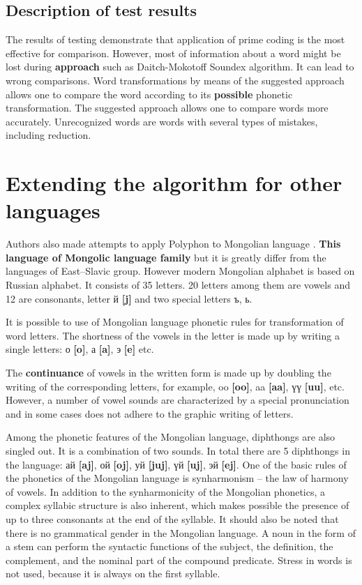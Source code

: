 \documentclass{svproc}
\begin{document}
\subsection{Description of test results }
The results of testing demonstrate that application of prime coding is the most effective for comparison. However, most of information about a word might be lost during \textbf{approach} such as Daitch-Mokotoff Soundex algorithm. It can lead to wrong comparisons. Word transformations by means of the suggested approach allows one to compare the word according to its \textbf{possible} phonetic transformation. The suggested approach allows one to compare words more accurately. Unrecognized words are words with several types of mistakes, including reduction.

\section{Extending the algorithm for other languages}
Authors also made attempts to apply Polyphon to Mongolian language \cite{Budnjam-2017}. \textbf{This language of Mongolic language family} but it is greatly differ from the languages of East--Slavic group. However modern Mongolian alphabet is based on Russian alphabet. It consists of 35 letters. 20 letters among them are vowels and 12 are consonants, letter й \textbf{[j]} and two special letters ъ, ь.

It is possible to use of Mongolian language phonetic rules for transformation of word letters. The shortness of the vowels in the letter is made up by writing a single letters: о \textbf{[o]}, а \textbf{[a]}, э \textbf{[e]} etc.

The \textbf{continuance} of vowels in the written form is made up by doubling the writing of the corresponding letters, for example, oo \textbf{[oo]}, aa \textbf{[aa]}, үү \textbf{[uu]}, etc. However, a number of vowel sounds are characterized by a special pronunciation and in some cases does not adhere to the graphic writing of letters.

Among the phonetic features of the Mongolian language, diphthongs are also singled out. It is a combination of two sounds. In total there are 5 diphthongs in the language: ай \textbf{[aj]}, ой \textbf{[oj]}, уй \textbf{[juj]}, үй \textbf{[uj]}, эй \textbf{[ej]}. One of the basic rules of the phonetics of the Mongolian language is synharmonism -- the law of harmony of vowels. In addition to the synharmonicity of the Mongolian phonetics, a complex syllabic structure is also inherent, which makes possible the presence of up to three consonants at the end of the syllable. It should also be noted that there is no grammatical gender in the Mongolian language. A noun in the form of a stem can perform the syntactic functions of the subject, the definition, the complement, and the nominal part of the compound predicate. Stress in words is not used, because it is always on the first syllable.
\end{document}
